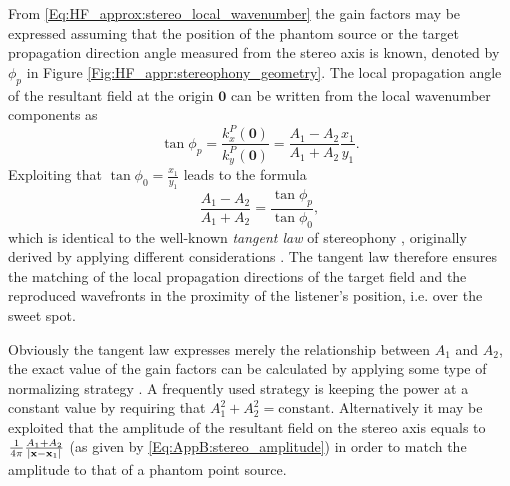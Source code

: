From \eqref{Eq:HF_approx:stereo_local_wavenumber} the gain factors may be expressed assuming that the position of the phantom source or the target propagation direction angle measured from the stereo axis is known, denoted by $\phi_p$ in Figure \eqref{Fig:HF_appr:stereophony_geometry}.
The local propagation angle of the resultant field at the origin $\mathbf{0}$ can be written from the local wavenumber components as
\begin{equation}
\tan \phi_p = \frac{k_x^P(\mathbf{0})}{k_y^P(\mathbf{0})} = \frac{A_1-A_2}{A_1+A_2}\frac{x_1}{y_1}.
\end{equation}
Exploiting that $\tan \phi_0 = \frac{x_1}{y_1}$ leads to the formula
\begin{equation}
\frac{A_1 - A_2}{A_1 + A_2} = \frac{\tan \phi_p}{\tan \phi_0},
\end{equation}
which is identical to the well-known \emph{tangent law} of stereophony \cite{SpringerHandbookSpeech2008, Pulkki1997, Pulkki2001a, Pulkki2001:phd}, originally derived by applying different considerations \cite{Bennett1985}.
The tangent law therefore ensures the matching of the local propagation directions of the target field and the reproduced wavefronts in the proximity of the listener's position, i.e. over the sweet spot.

Obviously the tangent law expresses merely the relationship between $A_1$ and $A_2$, the exact value of the gain factors can be calculated by applying some type of normalizing strategy \cite{Moore1990}.
A frequently used strategy is keeping the power at a constant value by requiring that $A_1^2 + A_2^2 = \text{constant}$.
Alternatively it may be exploited that the amplitude of the resultant field on the stereo axis equals to $\frac{1}{4\pi}\frac{A_1+A_2}{|\mathbf{x}-\mathbf{x}_1|}$ (as given by \eqref{Eq:AppB:stereo_amplitude}) in order to match the amplitude to that of a phantom point source.

